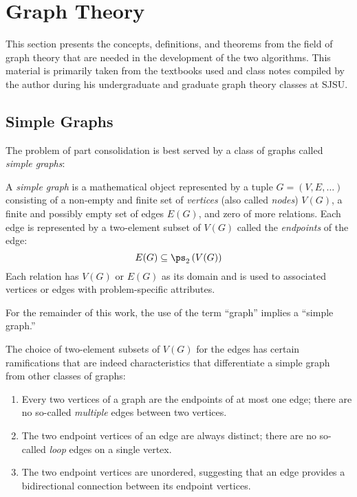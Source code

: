 \section{Graph Theory}

This section presents the concepts, definitions, and theorems from the field of graph theory that are needed in the
development of the two algorithms.  This material is primarily taken from the textbooks used \cite{chartrand} and
class notes compiled by the author during his undergraduate and graduate graph theory classes at SJSU.

\subsection{Simple Graphs}

The problem of part consolidation is best served by a class of graphs called \emph{simple graphs}:

\begin{definition}
  A \emph{simple graph} is a mathematical object represented by a tuple \(G=(V,E,\ldots)\) consisting of a
  non-empty and finite set of \emph{vertices} (also called \emph{nodes}) \(V(G)\), a finite and possibly empty set
  of edges \(E(G)\), and zero of more relations.  Each edge is represented by a two-element subset of \(V(G)\)
  called the \emph{endpoints} of the edge:
  \[E(G)\subseteq\ps_2\left(V(G)\right)\]
  Each relation has \(V(G)\) or \(E(G)\) as its domain and is used to associated vertices or edges with
  problem-specific attributes.
\end{definition}

For the remainder of this work, the use of the term ``graph'' implies a ``simple graph.''

The choice of two-element subsets of \(V(G)\) for the edges has certain ramifications that are indeed characteristics
that differentiate a simple graph from other classes of graphs:
\begin{enumerate}
\item Every two vertices of a graph are the endpoints of at most one edge; there are no so-called
  \emph{multiple} edges between two vertices.
\item The two endpoint vertices of an edge are always distinct; there are no so-called \emph{loop} edges on a
  single vertex.
\item The two endpoint vertices are unordered, suggesting that an edge provides a bidirectional connection between
  its endpoint vertices.
\end{enumerate}

